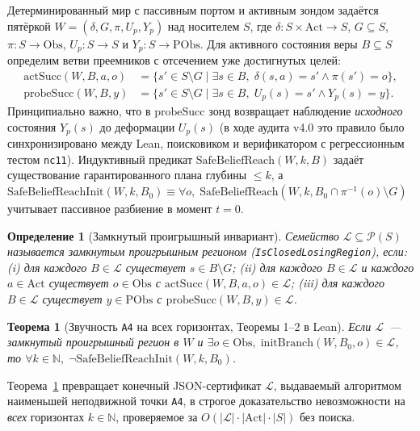 \documentclass[10pt,a4paper]{article}
\newcommand{\code}[1]{\nolinkurl{#1}}
\newtheorem{definition}{Определение}[section]
\newtheorem{theorem}{Теорема}[section]
\begin{document}
Детерминированный мир с пассивным портом и активным зондом задаётся пятёркой $W = (\delta, G, \pi, U_p, Y_p)$ над носителем $S$, где $\delta: S \times \mathrm{Act} \to S$, $G \subseteq S$, $\pi: S \to \mathrm{Obs}$, $U_p: S \to S$ и $Y_p: S \to \mathrm{PObs}$. Для активного состояния веры $B \subseteq S$ определим ветви преемников с отсечением уже достигнутых целей:
\begin{align*}
\mathrm{actSucc}(W, B, a, o) &= \{ s' \in S \setminus G \mid \exists s \in B,\; \delta(s, a) = s' \land \pi(s') = o \}, \\
\mathrm{probeSucc}(W, B, y)  &= \{ s' \in S \setminus G \mid \exists s \in B,\; U_p(s) = s' \land Y_p(s) = y \}.
\end{align*}
Принципиально важно, что в $\mathrm{probeSucc}$ зонд возвращает наблюдение \emph{исходного} состояния $Y_p(s)$ до деформации $U_p(s)$ (в ходе аудита v4.0 это правило было синхронизировано между Lean, поисковиком и верификатором с регрессионным тестом \code{nc11}). Индуктивный предикат $\mathrm{SafeBeliefReach}(W, k, B)$ задаёт существование гарантированного плана глубины $\le k$, а $\mathrm{SafeBeliefReachInit}(W, k, B_0) \equiv \forall o,\; \mathrm{SafeBeliefReach}(W, k, B_0 \cap \pi^{-1}(o) \setminus G)$ учитывает пассивное разбиение в момент $t=0$.

\begin{definition}[Замкнутый проигрышный инвариант]\label{def:clr}
Семейство $\mathcal{L} \subseteq \mathcal{P}(S)$ называется \emph{замкнутым проигрышным регионом} (\code{IsClosedLosingRegion}), если:
(i) для каждого $B \in \mathcal{L}$ существует $s \in B \setminus G$;
(ii) для каждого $B \in \mathcal{L}$ и каждого $a \in \mathrm{Act}$ существует $o \in \mathrm{Obs}$ с $\mathrm{actSucc}(W,B,a,o) \in \mathcal{L}$;
(iii) для каждого $B \in \mathcal{L}$ существует $y \in \mathrm{PObs}$ с $\mathrm{probeSucc}(W,B,y) \in \mathcal{L}$.
\end{definition}

\begin{theorem}[Звучность \code{A4} на всех горизонтах, Теоремы 1--2 в Lean]\label{thm:a4}
Если $\mathcal{L}$~--- замкнутый проигрышный регион в $W$ и $\exists o \in \mathrm{Obs},\; \mathrm{initBranch}(W, B_0, o) \in \mathcal{L}$, то $\forall k \in \mathbb{N},\; \neg\mathrm{SafeBeliefReachInit}(W, k, B_0)$.
\end{theorem}

Теорема~\ref{thm:a4} превращает конечный JSON-сертификат $\mathcal{L}$, выдаваемый алгоритмом наименьшей неподвижной точки \code{A4}, в строгое доказательство невозможности на \emph{всех} горизонтах $k \in \mathbb{N}$, проверяемое за $O(|\mathcal{L}|\cdot|\mathrm{Act}|\cdot|S|)$ без поиска.
\end{document}

